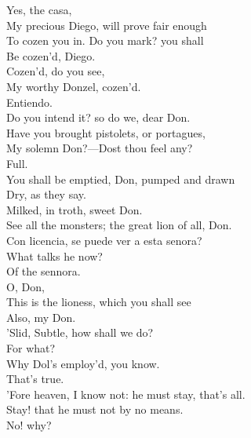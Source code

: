 \documentclass[a4paper,oneside]{memoir}
\begin{document}
\begin{drama*}
\subtlespeaks {} Yes, the casa,\\
My precious Diego, will prove fair enough\\
To cozen you in. Do you mark? you shall\\
Be cozen'd, Diego.\\
\facespeaks {} Cozen'd, do you see,\\
My worthy Donzel, cozen'd.\\
\surlyspeaks {} Entiendo.\\
\subtlespeaks Do you intend it? so do we, dear Don.\\
Have you brought pistolets, or portagues,\\
My solemn Don?---Dost thou feel any?\\
\facespeaks {} Full.\\
\subtlespeaks {} You shall be emptied, Don, pumped and drawn\\
Dry, as they say.\\
\facespeaks {} Milked, in troth, sweet Don.\\
\subtlespeaks {} See all the monsters; the great lion of all, Don.\\
\surlyspeaks Con licencia, se puede ver a esta senora?\\
\subtlespeaks What talks he now?\\
\facespeaks {} Of the sennora.\\
\subtlespeaks {} O, Don,\\
This is the lioness, which you shall see\\
Also, my Don.\\
\facespeaks {} 'Slid, Subtle, how shall we do?\\
\subtlespeaks For what?\\
\facespeaks {} Why Dol's employ'd, you know.\\
\subtlespeaks {} That's true.\\
'Fore heaven, I know not: he must stay, that's all.\\
\facespeaks Stay! that he must not by no means.\\
\subtlespeaks {} No! why?\\

\end{drama*}
\end{document}
